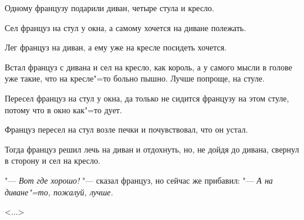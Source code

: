 Одному французу подарили диван, четыре стула и кресло.

Сел француз на стул у окна, а самому хочется на диване полежать.

Лег француз на диван, а ему уже на кресле посидеть хочется.

Встал француз с дивана и сел на кресло, как король, а у самого мысли в голове уже такие, что на кресле"=то больно пышно. Лучше попроще, на стуле.

Пересел француз на стул у окна, да только не сидится французу на этом стуле, потому что в окно как"=то дует.

Француз пересел на стул возле печки и почувствовал, что он устал.

Тогда француз решил лечь на диван и отдохнуть, но, не дойдя до дивана, свернул в сторону и сел на кресло.

"--- \textit{Вот где хорошо!} "--- сказал француз, но сейчас же прибавил: "--- \textit{А на диване"=то, пожалуй, лучше.}

\hfill <...>

